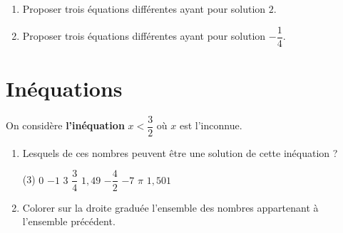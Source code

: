 \documentclass[10pt,a4paper]{article}
\begin{document}

\begin{exo}[][appro]
    \begin{enumerate}
        \item Proposer trois équations différentes ayant pour solution \(2\).
        \item Proposer trois équations différentes ayant pour solution \(-\dfrac{1}{4}\).
    \end{enumerate}
\end{exo}




\section{Inéquations}
\newpage
{}
\begin{exo}[][]

    On considère \textbf{l'inéquation} \( x< \dfrac{3}{2} \) où \(x\) est l'inconnue.
    \begin{enumerate}
        \item Lesquels de ces nombres peuvent être une solution de cette inéquation ? \begin{tasks}(3)
            \task \(0\)
            \task \(-1\)
            \task \(3\)
            \task \(\dfrac{3}{4}\)
            \task \(1,49\)
            \task \(-\dfrac{4}{2}\)
            \task \(-7\)
            \task \(\pi\)
            \task \(1,501\)
            
        \end{tasks}
        \item Colorer sur la droite graduée l'ensemble des nombres appartenant à l'ensemble précédent.\\
        
    \end{enumerate}
\end{exo}
\end{document}
